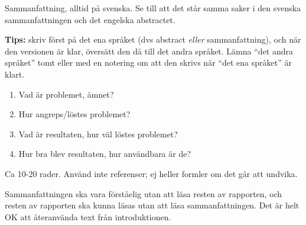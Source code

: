 Sammanfattning, alltid på svenska. Se till att det står samma saker i den svenska sammanfattningen och det engelska abstractet.

\textbf{Tips:} skriv först på det ena språket (dvs abstract \emph{eller} sammanfattning), och när den versionen är klar, översätt den då till det andra språket. Lämna ``det andra språket'' tomt eller med en notering om att den skrivs när ``det ena språket'' är klart.

\begin{enumerate}
\item Vad är problemet, ämnet?
\item Hur angreps/löstes problemet?
\item Vad är resultaten, hur väl löstes problemet?
\item Hur bra blev resultaten, hur användbara är de?
\end{enumerate}

Ca 10-20 rader. Använd inte referenser; ej heller formler om det går att undvika.

Sammanfattningen ska vara förståelig utan att läsa resten av rapporten, och resten av rapporten ska kunna läsas utan att läsa sammanfattningen. Det är helt OK att återanvända text från introduktionen.

